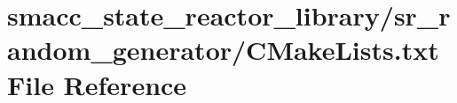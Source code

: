 \hypertarget{state__reactor__library_2sr__random__generator_2CMakeLists_8txt}{}\section{smacc\+\_\+state\+\_\+reactor\+\_\+library/sr\+\_\+random\+\_\+generator/\+C\+Make\+Lists.txt File Reference}
\label{state__reactor__library_2sr__random__generator_2CMakeLists_8txt}

